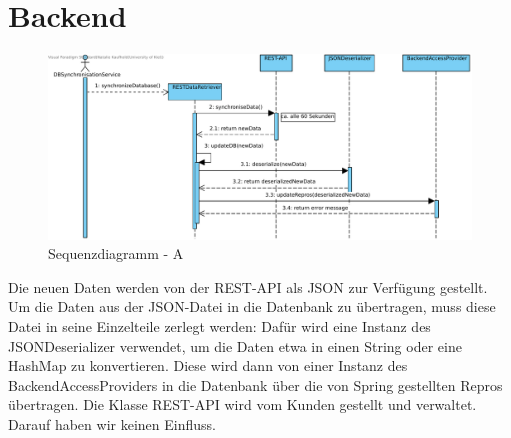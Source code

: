 


\section{Backend}

\begin{figure}[h]
	\centering
	\includegraphics[width=16cm]{img/diagrams/RESThandling.pdf}	
	\caption{Sequenzdiagramm - A}
	\label{fig:sequenz-a}
\end{figure}

\noindent
Die neuen Daten werden von der REST-API als JSON zur Verfügung gestellt. Um die Daten aus der JSON-Datei in die Datenbank zu übertragen, muss  diese Datei in seine Einzelteile zerlegt werden: Dafür wird eine Instanz des JSONDeserializer verwendet, um die Daten etwa in einen String oder eine HashMap zu konvertieren. Diese wird dann von einer Instanz des BackendAccessProviders in die Datenbank über die von Spring gestellten Repros übertragen.
Die Klasse REST-API wird vom Kunden gestellt und verwaltet. Darauf haben wir keinen Einfluss.
